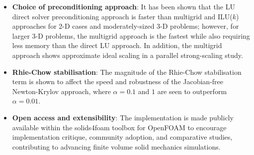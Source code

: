 \documentclass[sn-mathphys,Numbered]{sn-jnl}%
\begin{document}
\begin{itemize}
	\item \textbf{Choice of preconditioning approach}: It has been shown that the LU direct solver preconditioning approach is faster than multigrid and ILU($k$) approaches for 2-D cases and moderately-sized 3-D problems; however, for larger 3-D problems, the multigrid approach is the fastest while also requiring less memory than the direct LU approach. In addition, the multigrid approach shows approximate ideal scaling in a parallel strong-scaling study.
	
	\item \textbf{Rhie-Chow stabilisation}: The magnitude of the Rhie-Chow stabilisation term is shown to affect the speed and robustness of the Jacobian-free Newton-Krylov approach, where $\alpha = 0.1$ and $1$ are seen to outperform $\alpha = 0.01$.

	\item \textbf{Open access and extensibility}: The implementation is made publicly available within the solids4foam toolbox for OpenFOAM to encourage implementation critique, community adoption, and comparative studies, contributing to advancing finite volume solid mechanics simulations.
\end{itemize}

\end{document}
